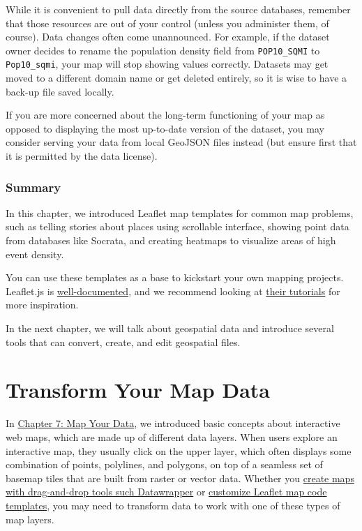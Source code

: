 \documentclass[
  english,
]{book}
\begin{document}
While it is convenient to pull data directly from the source databases,
remember that those resources are out of your control (unless you administer them, of course).
Data changes often come unannounced. For example, if the dataset owner decides
to rename the population density field from \texttt{POP10\_SQMI} to \texttt{Pop10\_sqmi},
your map will stop showing values correctly. Datasets may get moved
to a different domain name or get deleted entirely, so
it is wise to have a back-up file saved locally.

If you are more concerned about the long-term functioning of your map as opposed
to displaying the most up-to-date version of the dataset, you may consider serving
your data from local GeoJSON files instead (but ensure first that it is permitted by the data license).

\hypertarget{summary12}{%
\subsection*{Summary}\label{summary12}}

In this chapter, we introduced Leaflet map templates for common map problems,
such as telling stories about places using scrollable interface,
showing point data from databases like Socrata, and creating heatmaps
to visualize areas of high event density.

You can use these templates as a base to kickstart your own mapping projects.
Leaflet.js is \href{https://leafletjs.com/reference}{well-documented}, and we recommend
looking at \href{https://leafletjs.com/examples.html}{their tutorials} for more inspiration.

In the next chapter, we will talk about geospatial data and introduce several
tools that can convert, create, and edit geospatial files.

\hypertarget{transform}{%
\chapter{Transform Your Map Data}\label{transform}}

In \href{map.html}{Chapter 7: Map Your Data}, we introduced basic concepts about interactive web maps, which are made up of different data layers. When users explore an interactive map, they usually click on the upper layer, which often displays some combination of points, polylines, and polygons, on top of a seamless set of basemap tiles that are built from raster or vector data. Whether you \href{choropleth-datawrapper.html}{create maps with drag-and-drop tools such Datawrapper} or \href{leaflet.html}{customize Leaflet map code templates}, you may need to transform data to work with one of these types of map layers.
\end{document}
